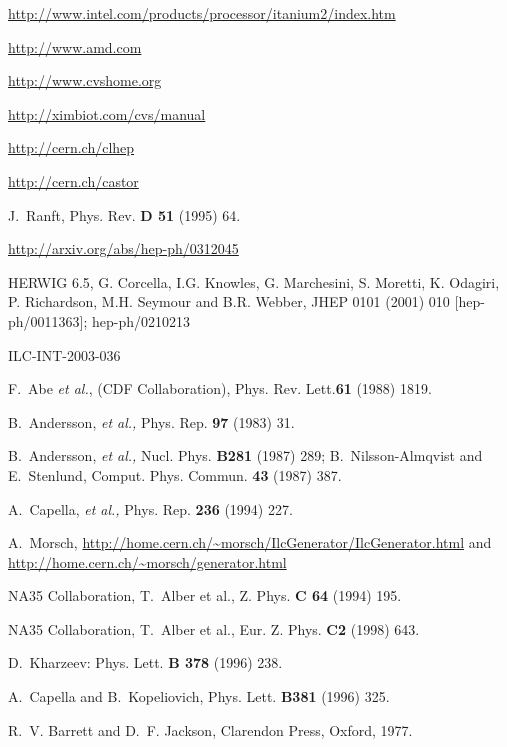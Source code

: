 \documentclass[12pt,a4paper,twoside]{article}
\begin{document}
{\begin{thebibliography}{99}
  \url{http://www.intel.com/products/processor/itanium2/index.htm}

 \url{http://www.amd.com}

 \url{http://www.cvshome.org}

 \url{http://ximbiot.com/cvs/manual}

 \url{http://cern.ch/clhep}

 \url{http://cern.ch/castor}

 J.~Ranft, Phys. Rev. \textbf{D 51} (1995) 64.

\url{http://arxiv.org/abs/hep-ph/0312045}

 HERWIG 6.5, G. Corcella, I.G. Knowles, G. Marchesini, S. Moretti,
K. Odagiri, P. Richardson, M.H. Seymour and B.R. Webber, JHEP 0101
(2001) 010 [hep-ph/0011363]; hep-ph/0210213 

  ILC-INT-2003-036

 F.~Abe {\it et al.}, (CDF Collaboration), Phys. Rev.
  Lett.\textbf{61} (1988) 1819.

 B.~Andersson, {\it et al.,} Phys. Rep. \textbf{97}
  (1983) 31.

 B.~Andersson, {\it et al.,} Nucl. Phys.
  \textbf{B281} (1987) 289; \newline B.~Nilsson-Almqvist and
  E.~Stenlund, Comput. Phys. Commun. \textbf{43} (1987) 387.

 A.~Capella, {\it et al.,} Phys. Rep. \textbf{236}
  (1994) 227.

 A.~Morsch,
  \url{http://home.cern.ch/~morsch/IlcGenerator/IlcGenerator.html} and
  \url{http://home.cern.ch/~morsch/generator.html}

 NA35 Collaboration, T.~Alber et al., \newblock Z.
  Phys. \textbf{C 64} (1994) 195.

 NA35 Collaboration, T.~Alber et al., \newblock
  Eur. Z. Phys. \textbf{C2} (1998) 643.

 D.~Kharzeev: \newblock Phys. Lett. \textbf{B
    378} (1996) 238.

 A.~Capella and B.~Kopeliovich, \newblock Phys.
  Lett. \textbf{B381} (1996) 325.

 R.~V. Barrett and D.~F. Jackson,  \newblock Clarendon Press, Oxford,
  1977.


\end{thebibliography}}
\end{document}
